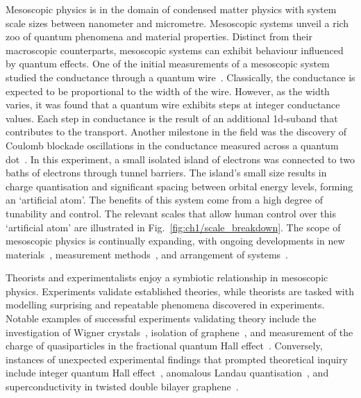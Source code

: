 \noindent Mesoscopic physics is in the domain of condensed matter physics with system scale sizes between nanometer and micrometre. Mesoscopic systems unveil a rich zoo of quantum phenomena and material properties. 
Distinct from their macroscopic counterparts, mesoscopic systems can exhibit behaviour influenced by quantum effects. One of the initial measurements of a mesoscopic system studied the conductance through a quantum wire~\cite{qpc_first_measurement, qpc_second_measurement}. 
Classically, the conductance is expected to be proportional to the width of the wire. 
However, as the width varies, it was found that a quantum wire exhibits steps at integer conductance values. Each step in conductance 
is the result of an additional 1d-suband that contributes to the transport. Another milestone in the field was the discovery of Coulomb blockade oscillations in the conductance measured across a quantum dot~\cite{first_charging_of_qd}. 
In this experiment, a small isolated island of electrons was connected to two baths of electrons through tunnel barriers. 
The island's small size results in charge quantisation and significant spacing between orbital energy levels, forming an `artificial atom'. 
The benefits of this system come from a high degree of tunability and control. The relevant scales that allow human control over this `artificial atom' are illustrated in Fig.~\ref{fig:ch1/scale_breakdown}.
The scope of mesoscopic physics is continually expanding, with ongoing developments in new materials~\cite{manfra_inas}, measurement methods~\cite{child_meas}, and arrangement of systems~\cite{borsoi2022shared, raysu}.

Theorists and experimentalists enjoy a symbiotic relationship in mesoscopic physics. Experiments validate established theories, while theorists are tasked with modelling surprising and repeatable phenomena discovered in experiments. Notable examples of successful experiments validating theory include the investigation of Wigner crystals~\cite{wigner_solid}, isolation of graphene~\cite{graphene}, and measurement of the charge of quasiparticles in the fractional quantum Hall effect~\cite{fractional_charge}. Conversely, instances of unexpected experimental findings that prompted theoretical inquiry include integer quantum Hall effect~\cite{klitzing}, anomalous Landau quantisation~\cite{landau_quantisation}, and superconductivity in twisted double bilayer graphene~\cite{raysu}.

